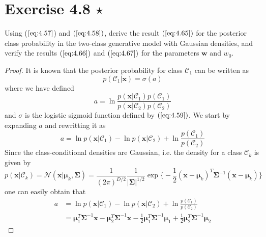 \section*{Exercise 4.8 $\star$}
Using ($\ref{eq:4.57}$) and $(\ref{eq:4.58})$, derive the result $(\ref{eq:4.65})$ 
for the posterior class probability in the two-class generative model with Gaussian
densities, and verify the results $(\ref{eq:4.66})$ and $(\ref{eq:4.67})$ for the
parameters $\mathbf{w}$ and $w_0$.

\vspace{1em}

\begin{proof}
    It is known that the posterior probability for class $\mathcal{C}_1$ can
    be written as
    \begin{equation}\label{eq:4.57}\tag{4.57}
        p(\mathcal{C}_1 | \mathbf{x}) = \sigma(a)
    \end{equation}
    where we have defined 
    \begin{equation}\label{eq:4.58}\tag{4.58}
        a = \ln \frac{p(\mathbf{x} | \mathcal{C}_1)p(\mathcal{C}_1)}
            {p(\mathbf{x} | \mathcal{C}_2)p(\mathcal{C}_2)}
    \end{equation}
    and $\sigma$ is the logistic sigmoid function defined by $(\ref{eq:4.59})$.
    We start by expanding $a$ and rewritting it as
    \[
        a = \ln p(\mathbf{x} | \mathcal{C}_1) - \ln p(\mathbf{x} | \mathcal{C}_2)
            + \ln \frac{p(\mathcal{C}_1)}{p(\mathcal{C}_2)}
    \] 
    Since the class-conditional densities are Gaussian, i.e. the density
    for a class $\mathcal{C}_k$ is given by
    \begin{equation}\label{eq:4.64}\tag{4.64}
        p(\mathbf{x} | \mathcal{C}_k) = \mathcal{N}(\mathbf{x} | \bm{\mu}_k, \mathbf{\Sigma})
        = \frac{1}{(2\pi)^{D/2}} \frac{1}{|\mathbf{\Sigma}|^{1/2}}
        \exp \bigg\{-\frac{1}{2} (\mathbf{x} - \bm{\mu}_k)^T\mathbf{\Sigma}^{-1}
        (\mathbf{x} - \bm{\mu}_k)\bigg\}
    \end{equation}
    one can easily obtain that
    \begin{align*}
        a 
        &= \ln p(\mathbf{x} | \mathcal{C}_1) - \ln p(\mathbf{x} | \mathcal{C}_2) 
        + \ln \frac{p(\mathcal{C}_1)}{p(\mathcal{C}_2)}\\
        &= \bm{\mu}_1^T\mathbf{\Sigma}^{-1}\mathbf{x}
        - \bm{\mu}_2^T\mathbf{\Sigma}^{-1}\mathbf{x} 
        - \frac{1}{2} \bm{\mu}_1^T\mathbf{\Sigma}^{-1}\bm{\mu}_1
        + \frac{1}{2} \bm{\mu}_2^T\mathbf{\Sigma}^{-1}\bm{\mu}_2

\end{align*}
\end{proof}
